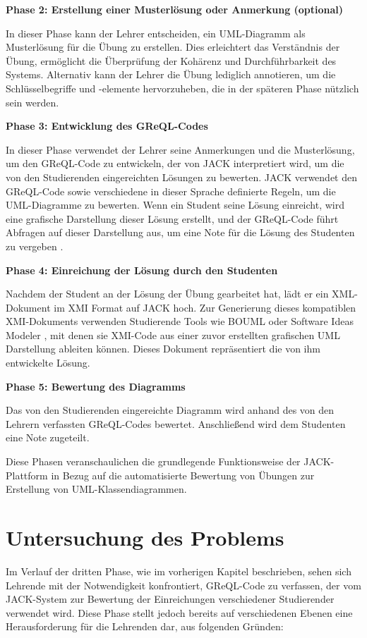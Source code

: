 \textbf{Phase 2: Erstellung einer Musterlösung oder Anmerkung (optional)}

In dieser Phase kann der Lehrer entscheiden, ein UML-Diagramm als Musterlösung für die Übung zu erstellen. Dies erleichtert das Verständnis der Übung, ermöglicht die Überprüfung der Kohärenz und Durchführbarkeit des Systems. Alternativ kann der Lehrer die Übung lediglich annotieren, um die Schlüsselbegriffe und -elemente hervorzuheben, die in der späteren Phase nützlich sein werden.


\textbf{Phase 3: Entwicklung des GReQL-Codes}

In dieser Phase verwendet der Lehrer seine Anmerkungen und die Musterlösung, um den GReQL-Code zu entwickeln, der von JACK interpretiert wird, um die von den Studierenden eingereichten Lösungen zu bewerten. JACK verwendet den GReQL-Code sowie verschiedene in dieser Sprache definierte Regeln, um die UML-Diagramme zu bewerten. Wenn ein Student seine Lösung einreicht, wird eine grafische Darstellung dieser Lösung erstellt, und der GReQL-Code führt Abfragen auf dieser Darstellung aus, um eine Note für die Lösung des Studenten zu vergeben \cite{striewe2011automated}.

\textbf{Phase 4: Einreichung der Lösung durch den Studenten}

Nachdem der Student an der Lösung der Übung gearbeitet hat, lädt er ein XML-Dokument im XMI Format auf JACK hoch. Zur Generierung dieses kompatiblen XMI-Dokuments verwenden Studierende Tools wie BOUML \cite{bouml} oder Software Ideas Modeler \cite{sim}, mit denen sie XMI-Code aus einer zuvor erstellten grafischen UML Darstellung ableiten können. Dieses Dokument repräsentiert die von ihm entwickelte Lösung.

    
\textbf{Phase 5: Bewertung des Diagramms}

Das von den Studierenden eingereichte Diagramm wird anhand des von den Lehrern verfassten GReQL-Codes bewertet. Anschließend wird dem Studenten eine Note zugeteilt.


Diese Phasen veranschaulichen die grundlegende Funktionsweise der JACK-Plattform in Bezug auf die automatisierte Bewertung von Übungen zur Erstellung von UML-Klassendiagrammen.


\section{Untersuchung des Problems}

Im Verlauf der dritten Phase, wie im vorherigen Kapitel beschrieben, sehen sich Lehrende mit der Notwendigkeit konfrontiert, GReQL-Code zu verfassen, der vom JACK-System zur Bewertung der Einreichungen verschiedener Studierender verwendet wird. Diese Phase stellt jedoch bereits auf verschiedenen Ebenen eine Herausforderung für die Lehrenden dar, aus folgenden Gründen:

